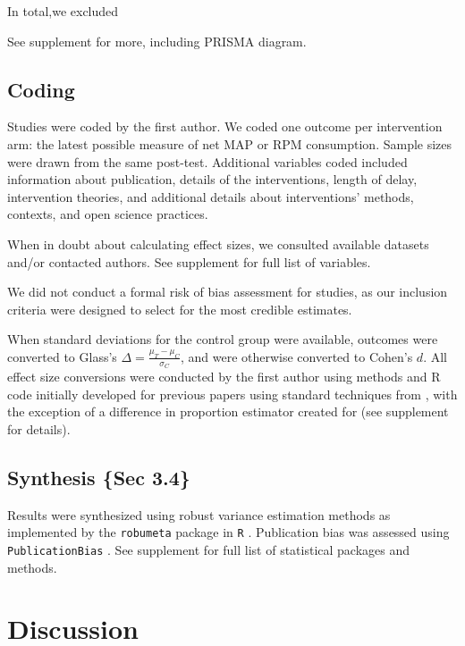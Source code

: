\documentclass[sn-nature,referee,pdflatex]{sn-jnl}
\begin{document}
In total,we excluded

See supplement for more, including PRISMA diagram.

\subsection{Coding}\label{sec3.3}

Studies were coded by the first author. We coded one outcome per
intervention arm: the latest possible measure of net MAP or RPM
consumption. Sample sizes were drawn from the same post-test. Additional
variables coded included information about publication, details of the
interventions, length of delay, intervention theories, and additional
details about interventions' methods, contexts, and open science
practices.

When in doubt about calculating effect sizes, we consulted available
datasets and/or contacted authors. See supplement for full list of
variables.

We did not conduct a formal risk of bias assessment for studies, as our
inclusion criteria were designed to select for the most credible
estimates.

When standard deviations for the control group were available, outcomes
were converted to Glass's \(\Delta = \frac{\mu_T - \mu_C}{\sigma_C}\),
and were otherwise converted to Cohen's \(d\). All effect size
conversions were conducted by the first author using methods and R code
initially developed for previous papers
\citep{paluck2019, paluck2021, porat2024} using standard techniques from
\citep{cooper2019}, with the exception of a difference in proportion
estimator created for \citep{paluck2021} (see supplement for details).

\subsection{Synthesis \{Sec 3.4\}}\label{synthesis-sec-3.4}

Results were synthesized using robust variance estimation methods
\citep{hedges2010} as implemented by the \texttt{robumeta} package in
\texttt{R} \citep{Rlang}. Publication bias was assessed using
\texttt{PublicationBias} \citep{mathur2024, mathur2020}. See supplement
for full list of statistical packages and methods.

\section{Discussion}\label{discussion}
\end{document}
